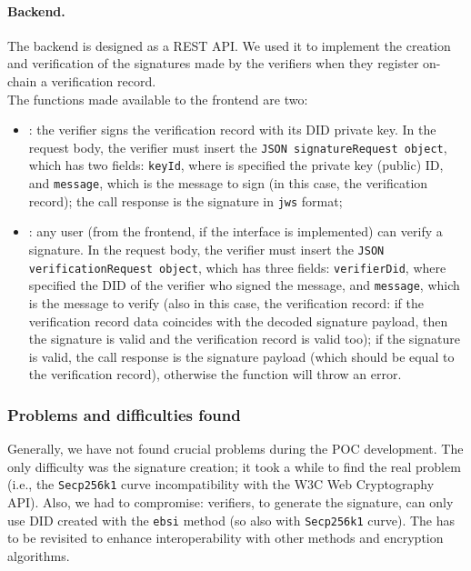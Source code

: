 \paragraph{Backend.}
The backend is designed as a REST API. We used it to implement the creation 
and verification of the signatures made by the verifiers when they register 
on-chain a verification record.
\vspace{0.3cm}\\
The functions made available to the frontend are two:
\begin{itemize}
    \item {}: the verifier signs the verification record
    with its DID private key. In the request body, the verifier must insert the
    \texttt{JSON signatureRequest object}, which has two fields: \texttt{keyId},
    where is specified the private key (public) ID, and \texttt{message},
    which is the message to sign (in this case, the verification record);
    the call response is the signature in \texttt{\acrshort{jws}} format;
    \item {}: any user (from the frontend, if the
    interface is implemented) can verify a signature. In the request body, the
    verifier must insert the \texttt{JSON verificationRequest object}, which has
    three fields: \texttt{verifierDid}, where specified the DID of the
    verifier who signed the message, and \texttt{message}, which is the
    message to verify (also in this case, the verification record: if the
    verification record data coincides with the decoded signature payload,
    then the signature is valid and the verification record is valid too);
    if the signature is valid, the call response is the signature payload (which
    should be equal to the verification record), otherwise the function
    will throw an error.
\end{itemize}

\subsubsection{Problems and difficulties found}
Generally, we have not found crucial problems during the POC development. The only 
difficulty was the signature creation; it took a while to find the real 
problem (i.e., the \texttt{Secp256k1} curve incompatibility with the W3C Web 
Cryptography API). Also, we had to compromise: verifiers, to generate the signature, 
can only use DID created with the \texttt{ebsi} method (so also with \texttt{Secp256k1}
curve). The  has to be revisited to enhance interoperability
with other methods and encryption algorithms.

